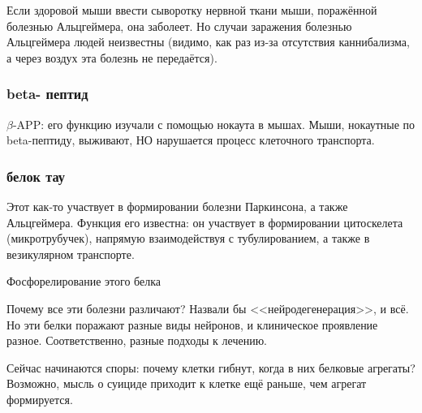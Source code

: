 \documentclass[main.tex]{subfiles}
\begin{document}
Если здоровой мыши ввести сыворотку нервной ткани мыши, поражённой болезнью Альцгеймера, она заболеет.
Но случаи заражения болезнью Альцгеймера людей неизвестны (видимо, как раз из-за отсутствия каннибализма, а через воздух эта болезнь не передаётся).

\subsubsection{beta- пептид}
$\beta$-APP: его функцию изучали с помощью нокаута в мышах.
Мыши, нокаутные по beta-пептиду, выживают, НО нарушается процесс клеточного транспорта.

\subsubsection{белок тау}

Этот как-то участвует в формировании болезни Паркинсона, а также Альцгеймера.
Функция его известна: он участвует в формировании цитоскелета (микротрубучек), напрямую взаимодействуя с тубулированием, а также в везикулярном транспорте.

Фосфорелирование этого белка %

Почему все эти болезни различают?
Назвали бы <<нейродегенерация>>, и всё.
Но эти белки поражают разные виды нейронов, и клиническое проявление разное.
Соответственно, разные подходы к лечению.

Сейчас начинаются споры: почему клетки гибнут, когда в них белковые агрегаты?
Возможно, мысль о суициде приходит к клетке ещё раньше, чем агрегат формируется.
\end{document}
